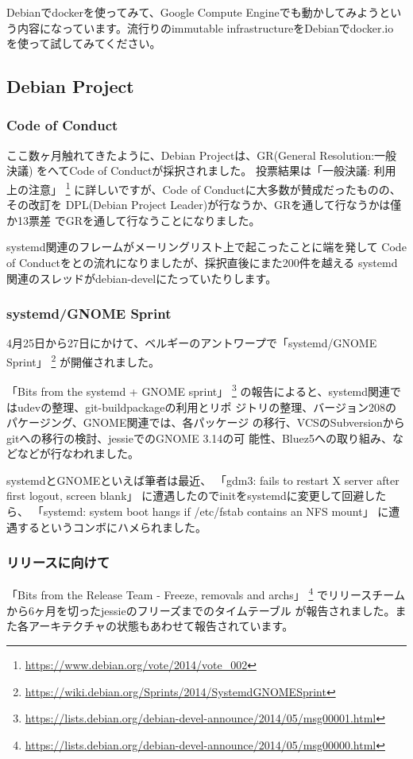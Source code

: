 \documentclass[mingoth,a4paper]{jsarticle}
\begin{document}
Debianでdockerを使ってみて、Google Compute Engineでも動かしてみようとい
う内容になっています。流行りのimmutable infrastructureをDebianでdocker.io
を使って試してみてください。

\subsection{Debian Project}

\subsubsection{Code of Conduct}

ここ数ヶ月触れてきたように、Debian Projectは、GR(General Resolution:一般決議)
をへてCode of Conductが採択されました。
投票結果は「一般決議: 利用上の注意」
\footnote{\url{https://www.debian.org/vote/2014/vote_002}}
に詳しいですが、Code of Conductに大多数が賛成だったものの、その改訂を
DPL(Debian Project Leader)が行なうか、GRを通して行なうかは僅か13票差
でGRを通して行なうことになりました。

systemd関連のフレームがメーリングリスト上で起こったことに端を発して
Code of Conductをとの流れになりましたが、採択直後にまた200件を越える
systemd関連のスレッドがdebian-develにたっていたりします。

\subsubsection{systemd/GNOME Sprint}

4月25日から27日にかけて、ベルギーのアントワープで「systemd/GNOME Sprint」
\footnote{\url{https://wiki.debian.org/Sprints/2014/SystemdGNOMESprint}}
が開催されました。

「Bits from the systemd + GNOME sprint」
\footnote{\url{https://lists.debian.org/debian-devel-announce/2014/05/msg00001.html}}
の報告によると、systemd関連ではudevの整理、git-buildpackageの利用とリポ
ジトリの整理、バージョン208のパケージング、GNOME関連では、各パッケージ
の移行、VCSのSubversionからgitへの移行の検討、jessieでのGNOME 3.14の可
能性、Bluez5への取り組み、などなどが行なわれました。

systemdとGNOMEといえば筆者は最近、
「gdm3: fails to restart X server after first logout, screen blank」
に遭遇したのでinitをsystemdに変更して回避したら、
「systemd: system boot hangs if /etc/fstab contains an NFS mount」
に遭遇するというコンボにハメられました。

\subsubsection{リリースに向けて}
「Bits from the Release Team - Freeze, removals and archs」
\footnote{\url{https://lists.debian.org/debian-devel-announce/2014/05/msg00000.html}}
でリリースチームから6ヶ月を切ったjessieのフリーズまでのタイムテーブル
が報告されました。また各アーキテクチャの状態もあわせて報告されています。
\end{document}
